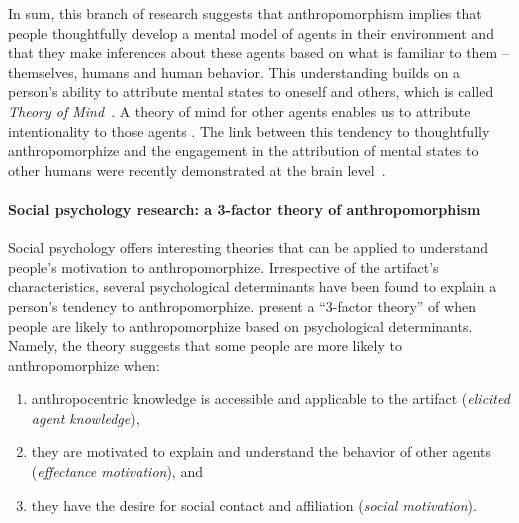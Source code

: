 \documentclass{frontiersSCNS} %
\begin{document}
In sum, this branch of research suggests that anthropomorphism implies that
people thoughtfully develop a mental model of agents in their environment and
that they make inferences about these agents based on what is familiar to them
-- themselves, humans and human behavior. This understanding builds on a
person's ability to attribute mental states to oneself and others, which is
called \textit{Theory of Mind}~\citep{premack1978does}. A theory of mind for
other agents enables us to attribute intentionality to those agents
\citep{leslie_pretense_1987,admoni_multi-category_2012}. The link between this
tendency to thoughtfully anthropomorphize and the engagement in the attribution
of mental states to other humans were recently demonstrated at the brain
level~\citep{cullen2013individual}.


\paragraph*{Social psychology research: a 3-factor theory of anthropomorphism\\}
\label{sec:psychological-factors}

Social psychology offers interesting theories that can be applied to understand people's motivation to anthropomorphize. Irrespective of the artifact's characteristics, several psychological determinants have been found to explain a person's tendency to anthropomorphize. \cite{epley_seeing_2007} present a ``3-factor theory'' of when people are likely to anthropomorphize based on psychological determinants. Namely, the theory suggests that some people are more likely to anthropomorphize when: 

\begin{enumerate}
	\item anthropocentric knowledge is accessible and applicable to the artifact (\textit{elicited agent knowledge}),
	\item they are motivated to explain and understand the behavior of other agents (\textit{effectance motivation}), and
	\item they have the desire for social contact and affiliation (\textit{social motivation}).
\end{enumerate}
\end{document}

